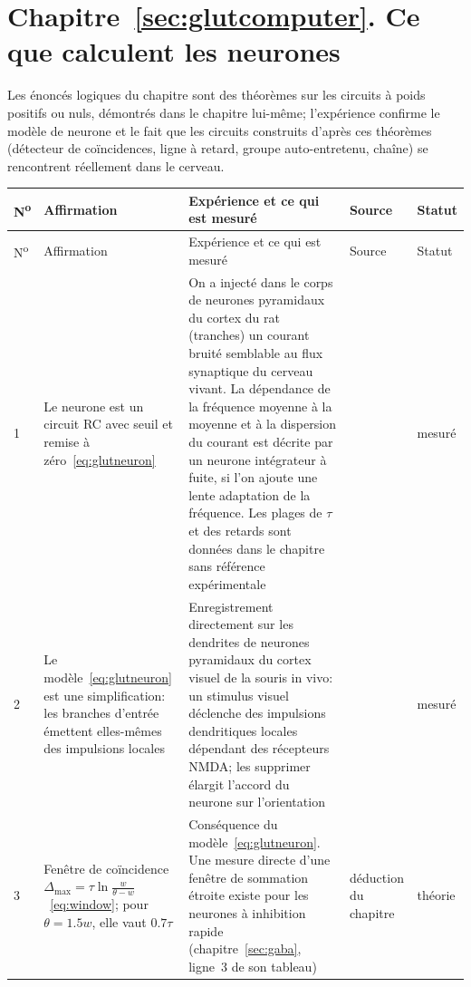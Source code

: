 \section{Chapitre~\ref{sec:glutcomputer}. Ce que calculent les neurones }

Les énoncés logiques du chapitre sont des théorèmes sur les circuits à poids positifs ou nuls, démontrés dans le chapitre lui-même; l'expérience confirme le modèle de neurone et le fait que les circuits construits d'après ces théorèmes (détecteur de coïncidences, ligne à retard, groupe auto-entretenu, chaîne) se rencontrent réellement dans le cerveau.

{\footnotesize
\setlength{\tabcolsep}{3pt}\renewcommand{\arraystretch}{1.15}
\begin{longtable}{>{\raggedright}p{0.5cm}>{\raggedright}p{4.0cm}>{\raggedright}p{5.6cm}>{\raggedright}p{2.3cm}>{\raggedright\arraybackslash}p{1.7cm}}
\toprule
N\textsuperscript{o} & Affirmation & Expérience et ce qui est mesuré & Source & Statut \\
\midrule\endfirsthead
\toprule
N\textsuperscript{o} & Affirmation & Expérience et ce qui est mesuré & Source & Statut \\
\midrule\endhead
1 & Le neurone est un circuit RC avec seuil et remise à zéro~\eqref{eq:glutneuron} & On a injecté dans le corps de neurones pyramidaux du cortex du rat (tranches) un courant bruité semblable au flux synaptique du cerveau vivant. La dépendance de la fréquence moyenne à la moyenne et à la dispersion du courant est décrite par un neurone intégrateur à fuite, si l'on ajoute une lente adaptation de la fréquence. Les plages de $\tau$ et des retards sont données dans le chapitre sans référence expérimentale & \cite{Rauch2003} & mesuré \\
2 & Le modèle~\eqref{eq:glutneuron} est une simplification: les branches d'entrée émettent elles-mêmes des impulsions locales & Enregistrement directement sur les dendrites de neurones pyramidaux du cortex visuel de la souris in vivo: un stimulus visuel déclenche des impulsions dendritiques locales dépendant des récepteurs NMDA; les supprimer élargit l'accord du neurone sur l'orientation & \cite{Smith2013} & mesuré \\
3 & Fenêtre de coïncidence $\Delta_{\max}=\tau\ln\frac{w}{\theta-w}$~\eqref{eq:window}; pour $\theta=1.5w$, elle vaut $0.7\tau$ & Conséquence du modèle~\eqref{eq:glutneuron}. Une mesure directe d'une fenêtre de sommation étroite existe pour les neurones à inhibition rapide (chapitre~\ref{sec:gaba}, ligne~3 de son tableau) & déduction du chapitre & théorie \\

\end{longtable}}

